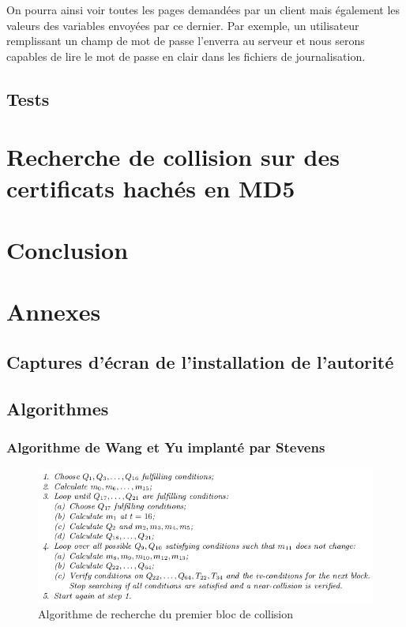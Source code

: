 \documentclass[a4paper,11pt,french]{report}
\begin{document}
On pourra ainsi voir toutes les pages demandées par un client mais également les valeurs des variables envoyées par ce dernier. Par exemple, un utilisateur remplissant un champ de mot de passe l'enverra au serveur et nous serons capables de lire le mot de passe en clair dans les fichiers de journalisation.


\newpage
\section{Tests}

\chapter{Recherche de collision sur des certificats hachés en MD5}


\chapter{Conclusion}


\chapter{Annexes}
\section{Captures d'écran de l'installation de l'autorité}

\section{Algorithmes}
\subsection{Algorithme de Wang et Yu implanté par Stevens}
\begin{figure}[h!]
  \includegraphics[scale=.61]{./images/fblock.png}
  \caption{Algorithme de recherche du premier bloc de collision}
\end{figure}
\end{document}
